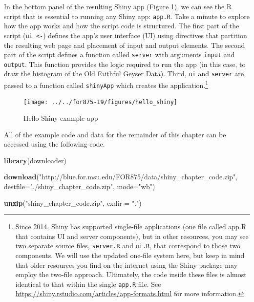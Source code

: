 \documentclass[]{krantz}
\makeatletter
\newenvironment{Shaded}{\begin{snugshade}}{\end{snugshade}}
\newcommand{\KeywordTok}[1]{\textcolor[rgb]{0.27,0.27,0.27}{\textbf{#1}}}
\newcommand{\DataTypeTok}[1]{\textcolor[rgb]{0.27,0.27,0.27}{#1}}
\newcommand{\StringTok}[1]{\textcolor[rgb]{0.5,0.5,0.5}{#1}}
\newcommand{\NormalTok}[1]{#1}
\newenvironment{kframe}{%
\medskip{}
\setlength{\fboxsep}{.8em}
 \def\at@end@of@kframe{}%
 \ifinner\ifhmode%
  \def\at@end@of@kframe{\end{minipage}}%
  \begin{minipage}{\columnwidth}%
 \fi\fi%
 \def\FrameCommand##1{\hskip\@totalleftmargin \hskip-\fboxsep
 \colorbox{shadecolor}{##1}\hskip-\fboxsep
     \hskip-\linewidth \hskip-\@totalleftmargin \hskip\columnwidth}%
 \MakeFramed {\advance\hsize-\width
   \@totalleftmargin\z@ \linewidth\hsize
   \@setminipage}}%
 {\par\unskip\endMakeFramed%
 \at@end@of@kframe}
\renewenvironment{Shaded}{\begin{kframe}}{\end{kframe}}
\makeatother
\begin{document}
In the bottom panel of the resulting Shiny app (Figure \ref{fig:hello}),
we can see the R script that is essential to running any Shiny app:
\texttt{app.R}. Take a minute to explore how the app works and how the
script code is structured. The first part of the script
(\texttt{ui\ \textless{}-}) defines the app's user interface (UI) using
directives that partition the resulting web page and placement of input
and output elements. The second part of the script defines a function
called \texttt{server} with arguments \texttt{input} and
\texttt{output}. This function provides the logic required to run the
app (in this case, to draw the histogram of the Old Faithful Geyser
Data). Third, \texttt{ui} and \texttt{server} are passed to a function
called \texttt{shinyApp} which creates the application.\footnote{Since
  2014, Shiny has supported single-file applications (one file called
  app.R that contains UI and server components), but in other resources,
  you may see two separate source files, \texttt{server.R} and
  \texttt{ui.R}, that correspond to those two components. We will use
  the updated one-file system here, but keep in mind that older
  resources you find on the internet using the Shiny package may employ
  the two-file approach. Ultimately, the code inside these files is
  almost identical to that within the single \texttt{app.R} file. See
  \url{https://shiny.rstudio.com/articles/app-formats.html} for more
  information.}

\begin{figure}
\texttt{[image: ../../for875-19/figures/hello\_shiny]} \caption{Hello Shiny example app}\label{fig:hello}
\end{figure}

All of the example code and data for the remainder of this chapter can
be accessed using the following code.

\begin{Shaded}
\begin{Highlighting}[]
\KeywordTok{library}\NormalTok{(downloader)}

\KeywordTok{download}\NormalTok{(}\StringTok{"http://blue.for.msu.edu/FOR875/data/shiny_chapter_code.zip"}\NormalTok{, }
         \DataTypeTok{destfile=}\StringTok{"./shiny_chapter_code.zip"}\NormalTok{, }\DataTypeTok{mode=}\StringTok{"wb"}\NormalTok{)}

\KeywordTok{unzip}\NormalTok{(}\StringTok{"shiny_chapter_code.zip"}\NormalTok{, }\DataTypeTok{exdir =} \StringTok{"."}\NormalTok{)}
\end{Highlighting}
\end{Shaded}
\end{document}
